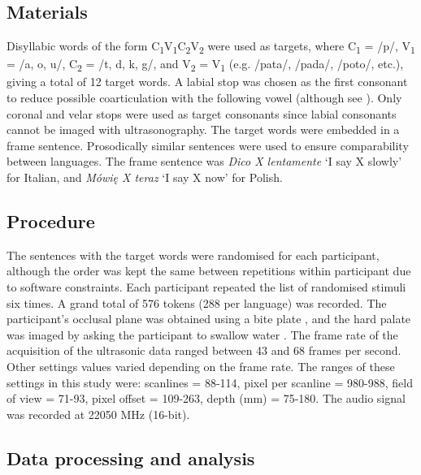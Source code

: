 \documentclass[authoryear, twocolumn]{elsarticle}
\begin{document}
\subsection{Materials}\label{materials}

Disyllabic words of the form
C\textsubscript{1}V\textsubscript{1}C\textsubscript{2}V\textsubscript{2}
were used as targets, where C\textsubscript{1} = /p/, V\textsubscript{1}
= /a, o, u/, C\textsubscript{2} = /t, d, k, g/, and V\textsubscript{2} =
V\textsubscript{1} (e.g. /pata/, /pada/, /poto/, etc.), giving a total
of 12 target words. A labial stop was chosen as the first consonant to
reduce possible coarticulation with the following vowel (although see
\citealt{vazquez-alvarez2007}). Only coronal and velar stops were used
as target consonants since labial consonants cannot be imaged with
ultrasonography. The target words were embedded in a frame sentence.
Prosodically similar sentences were used to ensure comparability between
languages. The frame sentence was \emph{Dico X lentamente} `I say X
slowly' for Italian, and \emph{Mówię X teraz} `I say X now' for Polish.

\subsection{Procedure}\label{procedure}

The sentences with the target words were randomised for each
participant, although the order was kept the same between repetitions
within participant due to software constraints. Each participant
repeated the list of randomised stimuli six times. A grand total of 576
tokens (288 per language) was recorded. The participant's occlusal plane
was obtained using a bite plate \citep{scobbie2011}, and the hard palate
was imaged by asking the participant to swallow water
\citep{epstein2005}. The frame rate of the acquisition of the ultrasonic
data ranged between 43 and 68 frames per second. Other settings values
varied depending on the frame rate. The ranges of these settings in this
study were: scanlines = 88-114, pixel per scanline = 980-988, field of
view = 71-93, pixel offset = 109-263, depth (mm) = 75-180. The audio
signal was recorded at 22050 MHz (16-bit).

\subsection{Data processing and
analysis}\label{data-processing-and-analysis}
\end{document}
